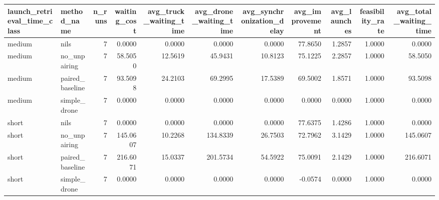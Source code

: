 \begin{tabular}{llrrrrrrrrr}
\toprule
launch_retrieval_time_class & method_name & n_runs & waiting_cost & avg_truck_waiting_time & avg_drone_waiting_time & avg_synchronization_delay & avg_improvement & avg_launches & feasibility_rate & avg_total_waiting_time \\
\midrule
medium & nils & 7 & 0.0000 & 0.0000 & 0.0000 & 0.0000 & 77.8650 & 1.2857 & 1.0000 & 0.0000 \\
medium & no_unpairing & 7 & 58.5050 & 12.5619 & 45.9431 & 10.8123 & 75.1225 & 2.2857 & 1.0000 & 58.5050 \\
medium & paired_baseline & 7 & 93.5098 & 24.2103 & 69.2995 & 17.5389 & 69.5002 & 1.8571 & 1.0000 & 93.5098 \\
medium & simple_drone & 7 & 0.0000 & 0.0000 & 0.0000 & 0.0000 & 0.0000 & 0.0000 & 1.0000 & 0.0000 \\
short & nils & 7 & 0.0000 & 0.0000 & 0.0000 & 0.0000 & 77.6375 & 1.4286 & 1.0000 & 0.0000 \\
short & no_unpairing & 7 & 145.0607 & 10.2268 & 134.8339 & 26.7503 & 72.7962 & 3.1429 & 1.0000 & 145.0607 \\
short & paired_baseline & 7 & 216.6071 & 15.0337 & 201.5734 & 54.5922 & 75.0091 & 2.1429 & 1.0000 & 216.6071 \\
short & simple_drone & 7 & 0.0000 & 0.0000 & 0.0000 & 0.0000 & -0.0574 & 0.0000 & 1.0000 & 0.0000 \\
\bottomrule
\end{tabular}
